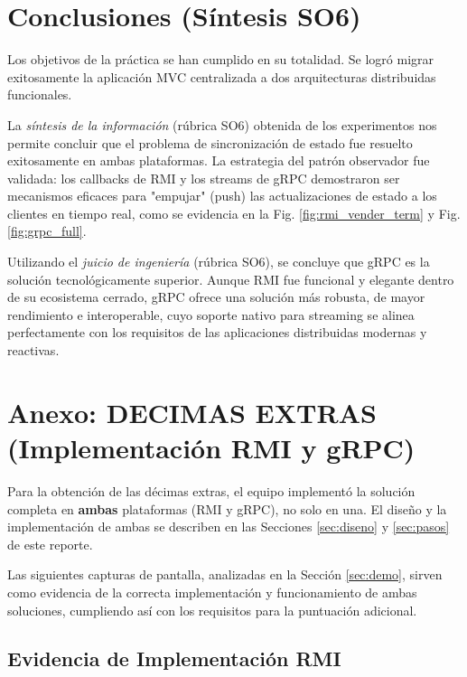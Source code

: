 \documentclass[11pt, a4paper]{article}
\begin{document}
\section{Conclusiones (Síntesis SO6)}
\label{sec:conclusiones}

Los objetivos de la práctica se han cumplido en su totalidad. Se logró migrar exitosamente la aplicación MVC centralizada a dos arquitecturas distribuidas funcionales.

La \textit{síntesis de la información} (rúbrica SO6) obtenida de los experimentos nos permite concluir que el problema de sincronización de estado fue resuelto exitosamente en ambas plataformas. La estrategia del patrón observador fue validada: los callbacks de RMI y los streams de gRPC demostraron ser mecanismos eficaces para "empujar" (push) las actualizaciones de estado a los clientes en tiempo real, como se evidencia en la Fig. \ref{fig:rmi_vender_term} y Fig. \ref{fig:grpc_full}.

Utilizando el \textit{juicio de ingeniería} (rúbrica SO6), se concluye que gRPC es la solución tecnológicamente superior. Aunque RMI fue funcional y elegante dentro de su ecosistema cerrado, gRPC ofrece una solución más robusta, de mayor rendimiento e interoperable, cuyo soporte nativo para streaming se alinea perfectamente con los requisitos de las aplicaciones distribuidas modernas y reactivas.

\newpage
\appendix

\section{Anexo: DECIMAS EXTRAS (Implementación RMI y gRPC)}
\label{sec:anexo}

Para la obtención de las décimas extras, el equipo implementó la solución completa en \textbf{ambas} plataformas (RMI y gRPC), no solo en una. El diseño y la implementación de ambas se describen en las Secciones \ref{sec:diseno} y \ref{sec:pasos} de este reporte.

Las siguientes capturas de pantalla, analizadas en la Sección \ref{sec:demo}, sirven como evidencia de la correcta implementación y funcionamiento de ambas soluciones, cumpliendo así con los requisitos para la puntuación adicional.

\subsection{Evidencia de Implementación RMI}
\end{document}
